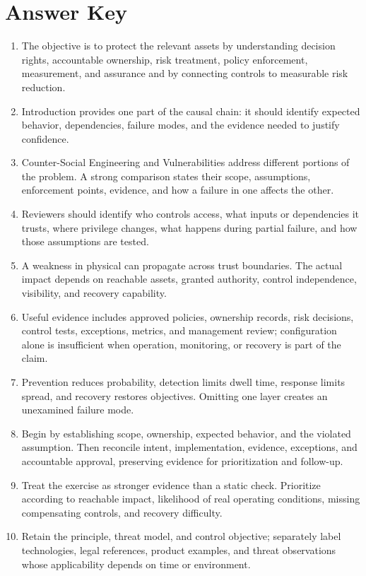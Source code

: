 \documentclass[11pt,letterpaper]{article}
\begin{document}
\section*{Answer Key}
\begin{enumerate}
\item The objective is to protect the relevant assets by understanding decision rights, accountable ownership, risk treatment, policy enforcement, measurement, and assurance and by connecting controls to measurable risk reduction.
\item Introduction provides one part of the causal chain: it should identify expected behavior, dependencies, failure modes, and the evidence needed to justify confidence.
\item Counter-Social Engineering and Vulnerabilities address different portions of the problem. A strong comparison states their scope, assumptions, enforcement points, evidence, and how a failure in one affects the other.
\item Reviewers should identify who controls access, what inputs or dependencies it trusts, where privilege changes, what happens during partial failure, and how those assumptions are tested.
\item A weakness in physical can propagate across trust boundaries. The actual impact depends on reachable assets, granted authority, control independence, visibility, and recovery capability.
\item Useful evidence includes approved policies, ownership records, risk decisions, control tests, exceptions, metrics, and management review; configuration alone is insufficient when operation, monitoring, or recovery is part of the claim.
\item Prevention reduces probability, detection limits dwell time, response limits spread, and recovery restores objectives. Omitting one layer creates an unexamined failure mode.
\item Begin by establishing scope, ownership, expected behavior, and the violated assumption. Then reconcile intent, implementation, evidence, exceptions, and accountable approval, preserving evidence for prioritization and follow-up.
\item Treat the exercise as stronger evidence than a static check. Prioritize according to reachable impact, likelihood of real operating conditions, missing compensating controls, and recovery difficulty.
\item Retain the principle, threat model, and control objective; separately label technologies, legal references, product examples, and threat observations whose applicability depends on time or environment.
\end{enumerate}
\end{document}
